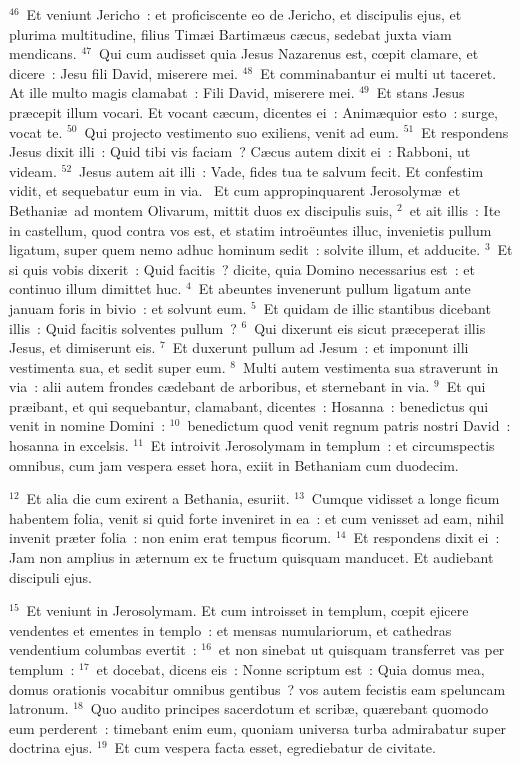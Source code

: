 ${}^{46}$~Et veniunt Jericho~: et proficiscente eo de Jericho, et discipulis ejus, et plurima multitudine, filius Tim\ae i Bartim\ae us c\ae cus, sedebat juxta viam mendicans.
${}^{47}$~Qui cum audisset quia Jesus Nazarenus est, cœpit clamare, et dicere~: Jesu fili David, miserere mei.
${}^{48}$~Et comminabantur ei multi ut taceret. At ille multo magis clamabat~: Fili David, miserere mei.
${}^{49}$~Et stans Jesus pr\ae cepit illum vocari. Et vocant c\ae cum, dicentes ei~: Anim\ae quior esto~: surge, vocat te.
${}^{50}$~Qui projecto vestimento suo exiliens, venit ad eum.
${}^{51}$~Et respondens Jesus dixit illi~: Quid tibi vis faciam~? C\ae cus autem dixit ei~: Rabboni, ut videam.
${}^{52}$~Jesus autem ait illi~: Vade, fides tua te salvum fecit. Et confestim vidit, et sequebatur eum in via.
~\lettrine[lines=10,image=true,loversize=0.05,lraise=-0.03]{E}{}t cum appropinquarent Jerosolym\ae\ et Bethani\ae\ ad montem Olivarum, mittit duos ex discipulis suis,
${}^{2}$~et ait illis~: Ite in castellum, quod contra vos est, et statim intro\"euntes illuc, invenietis pullum ligatum, super quem nemo adhuc hominum sedit~: solvite illum, et adducite.
${}^{3}$~Et si quis vobis dixerit~: Quid facitis~? dicite, quia Domino necessarius est~: et continuo illum dimittet huc.
${}^{4}$~Et abeuntes invenerunt pullum ligatum ante januam foris in bivio~: et solvunt eum.
${}^{5}$~Et quidam de illic stantibus dicebant illis~: Quid facitis solventes pullum~?
${}^{6}$~Qui dixerunt eis sicut pr\ae ceperat illis Jesus, et dimiserunt eis.
${}^{7}$~Et duxerunt pullum ad Jesum~: et imponunt illi vestimenta sua, et sedit super eum.
${}^{8}$~Multi autem vestimenta sua straverunt in via~: alii autem frondes c\ae debant de arboribus, et sternebant in via.
${}^{9}$~Et qui pr\ae ibant, et qui sequebantur, clamabant, dicentes~: Hosanna~: benedictus qui venit in nomine Domini~:
${}^{10}$~benedictum quod venit regnum patris nostri David~: hosanna in excelsis.
${}^{11}$~Et introivit Jerosolymam in templum~: et circumspectis omnibus, cum jam vespera esset hora, exiit in Bethaniam cum duodecim.


${}^{12}$~Et alia die cum exirent a Bethania, esuriit.
${}^{13}$~Cumque vidisset a longe ficum habentem folia, venit si quid forte inveniret in ea~: et cum venisset ad eam, nihil invenit pr\ae ter folia~: non enim erat tempus ficorum.
${}^{14}$~Et respondens dixit ei~: Jam non amplius in \ae ternum ex te fructum quisquam manducet. Et audiebant discipuli ejus.


${}^{15}$~Et veniunt in Jerosolymam. Et cum introisset in templum, cœpit ejicere vendentes et ementes in templo~: et mensas numulariorum, et cathedras vendentium columbas evertit~:
${}^{16}$~et non sinebat ut quisquam transferret vas per templum~:
${}^{17}$~et docebat, dicens eis~: Nonne scriptum est~: Quia domus mea, domus orationis vocabitur omnibus gentibus~? vos autem fecistis eam speluncam latronum.
${}^{18}$~Quo audito principes sacerdotum et scrib\ae , qu\ae rebant quomodo eum perderent~: timebant enim eum, quoniam universa turba admirabatur super doctrina ejus.
${}^{19}$~Et cum vespera facta esset, egrediebatur de civitate.


